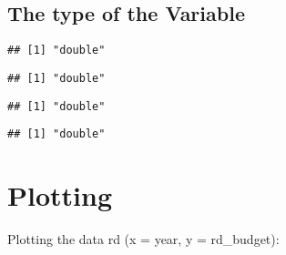 \documentclass[]{article}
\newenvironment{Shaded}{\begin{snugshade}}{\end{snugshade}}
\newcommand{\KeywordTok}[1]{\textcolor[rgb]{0.13,0.29,0.53}{\textbf{#1}}}
\newcommand{\OperatorTok}[1]{\textcolor[rgb]{0.81,0.36,0.00}{\textbf{#1}}}
\newcommand{\NormalTok}[1]{#1}
\begin{document}
\subsection{The type of the Variable}\label{the-type-of-the-variable}

\begin{Shaded}
\end{Shaded}

\begin{verbatim}
## [1] "double"
\end{verbatim}

\begin{Shaded}
\end{Shaded}

\begin{verbatim}
## [1] "double"
\end{verbatim}

\begin{Shaded}
\end{Shaded}

\begin{verbatim}
## [1] "double"
\end{verbatim}

\begin{Shaded}
\end{Shaded}

\begin{verbatim}
## [1] "double"
\end{verbatim}

\section{Plotting}\label{plotting}

Plotting the data rd (x = year, y = rd\_budget):
\end{document}
